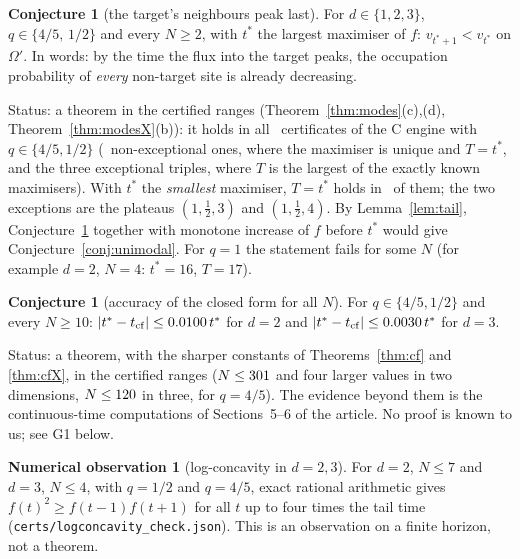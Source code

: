 \documentclass[11pt,a4paper]{article}
\theoremstyle{definition}
\newtheorem{conjecture}[theorem]{Conjecture}
\newtheorem{observation}[theorem]{Numerical observation}
\theoremstyle{remark}
\begin{document}
\begin{conjecture}[the target's neighbours peak last]\label{conj:last}
For $d\in\{1,2,3\}$, $q\in\{4/5,\,1/2\}$ and every $N\ge2$, with $t^*$ the largest maximiser of $f$: $v_{t^*+1}<v_{t^*}$ on $\Omega'$. In words: by the time the flux into the target peaks, the occupation probability of \emph{every} non-target site is already decreasing.
\end{conjecture}
Status: a theorem in the certified ranges (Theorem~\ref{thm:modes}(c),(d), Theorem~\ref{thm:modesX}(b)): it holds in all \XLastCerts\ certificates of the C engine with $q\in\{4/5,1/2\}$ (\XLastNonExc\ non-exceptional ones, where the maximiser is unique and $T=t^*$, and the three exceptional triples, where $T$ is the largest of the exactly known maximisers). With $t^*$ the \emph{smallest} maximiser, $T=t^*$ holds in \XLastSmall\ of them; the two exceptions are the plateaus $(1,\frac12,3)$ and $(1,\frac12,4)$. By Lemma~\ref{lem:tail}, Conjecture~\ref{conj:last} together with monotone increase of $f$ before $t^*$ would give Conjecture~\ref{conj:unimodal}. For $q=1$ the statement fails for some $N$ (for example $d=2$, $N=4$: $t^*=16$, $T=17$).

\begin{conjecture}[accuracy of the closed form for all $N$]\label{conj:cf}
For $q\in\{4/5,1/2\}$ and every $N\ge10$: $|t^*-t_{\rm cf}|\le0.0100\,t^*$ for $d=2$ and $|t^*-t_{\rm cf}|\le0.0030\,t^*$ for $d=3$.
\end{conjecture}
Status: a theorem, with the sharper constants of Theorems~\ref{thm:cf} and \ref{thm:cfX}, in the certified ranges ($N\le301$ and four larger values in two dimensions, $N\le120$ in three, for $q=4/5$). The evidence beyond them is the continuous-time computations of Sections~5--6 of the article. No proof is known to us; see G1 below.

\begin{observation}[log-concavity in $d=2,3$]\label{obs:lc}
For $d=2$, $N\le7$ and $d=3$, $N\le4$, with $q=1/2$ and $q=4/5$, exact rational arithmetic gives $f(t)^2\ge f(t-1)f(t+1)$ for all $t$ up to four times the tail time (\texttt{certs/logconcavity\_check.json}). This is an observation on a finite horizon, not a theorem.
\end{observation}
\end{document}
